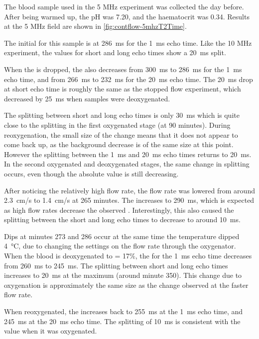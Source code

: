 The blood sample used in the 5 MHz experiment was collected the day before.
After being warmed up, the pH was 7.20, and the haematocrit was 0.34.
Results at the 5 MHz field are shown in \autoref{fig:contflow-5mhzT2Time}.

The initial \Ttwo for this sample is at \SI{286}{ms} for the \SI{1}{ms} echo time.
Like the 10 MHz experiment, the \Ttwo values for  short and long echo times show a \SI{20}{ms} split.

When the \SOtwo is dropped, the \Ttwo also decreases from \SI{300}{ms} to \SI{286}{ms} for the \SI{1}{ms} echo time, and from \SI{266}{ms} to \SI{232}{ms} for the \SI{20}{ms} echo time.
The \SI{20}{ms} drop at short echo time is roughly the same as the stopped flow experiment, which decreased by \SI{25}{ms} when samples were deoxygenated.

The splitting between short and long echo times is only \SI{30}{ms} which is quite close to the splitting in the first oxygenated stage (at 90 minutes).
During reoxygenation, the small size of the \Ttwo change means that it does not appear to come back up, as the background \Ttwo decrease is of the same size at this point.
However the splitting between the \SI{1}{ms} and \SI{20}{ms} echo times returns to \SI{20}{ms}.
In the second oxygenated and deoxygenated stages, the same change in splitting occurs, even though the absolute \Ttwo value is still decreasing.

After noticing the relatively high flow rate, the flow rate was lowered from around \SI{2.3}{cm/s} to \SI{1.4}{cm/s} at 265 minutes.
The \Ttwo increases to \SI{290}{ms}, which is expected as high flow rates decrease the observed \Ttwo.
Interestingly, this also caused the splitting between the short and long echo times to decrease to around \SI{10}{ms}.

Dips at minutes 273 and 286 occur at the same time the temperature dipped \SI{4}{\celsius}, due to changing the settings on the flow rate through the oxygenator.
When the blood is deoxygenated to \SOtwo = 17\%,  the \Ttwo for the \SI{1}{ms} echo time decreases from \SI{260}{ms} to \SI{245}{ms}.
The splitting between short and long echo times increases to \SI{20}{ms} at the maximum (around minute 350).
This \Ttwo change due to oxygenation is approximately the same size as the change observed at the faster flow rate.

When reoxygenated, the \Ttwo increases back to \SI{255}{ms} at the \SI{1}{ms} echo time, and \SI{245}{ms} at the \SI{20}{ms} echo time.
The splitting of \SI{10}{ms} is consistent with the value when it was oxygenated.

